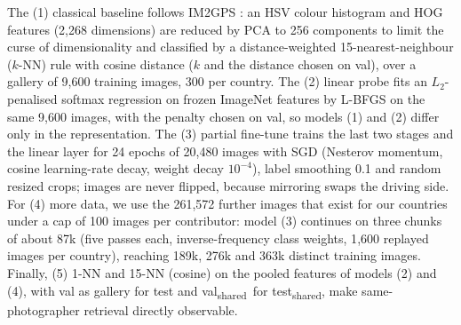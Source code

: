 \documentclass[9pt]{extarticle}
\newcommand{\tsh}{test\textsubscript{shared}}
\newcommand{\vsh}{val\textsubscript{shared}}
\begin{document}
The (1) classical baseline follows IM2GPS \citep{hays2008im2gps}: an HSV colour histogram and
HOG features \citep{dalal2005hog} (2{,}268 dimensions) are reduced by PCA to 256 components to
limit the curse of dimensionality \citep{beyer1999nearest} and classified by a
distance-weighted 15-nearest-neighbour ($k$-NN) rule with cosine distance ($k$ and the
distance chosen on val), over a gallery of 9{,}600 training images, 300 per country. The (2)
linear probe fits an $L_2$-penalised softmax regression on frozen ImageNet features
\citep{deng2009imagenet,kornblith2019transfer} by L-BFGS on the same 9{,}600 images, with the
penalty chosen on val, so models (1) and (2) differ only in the representation. The (3)
partial fine-tune trains the last two stages and the linear layer for 24 epochs of 20{,}480
images with SGD (Nesterov momentum, cosine learning-rate decay, weight decay $10^{-4}$), label
smoothing 0.1 and random resized crops; images are never flipped, because mirroring swaps the
driving side. For (4) more data, we use the 261{,}572 further images that exist for our
countries under a cap of 100 images per contributor: model (3) continues on three chunks of
about 87k (five passes each, inverse-frequency class weights, 1{,}600 replayed images per
country), reaching 189k, 276k and 363k distinct training images. Finally, (5) 1-NN and 15-NN
(cosine) on the pooled features of models (2) and (4), with val as gallery for test and \vsh\
for \tsh, make same-photographer retrieval directly observable.
\end{document}
